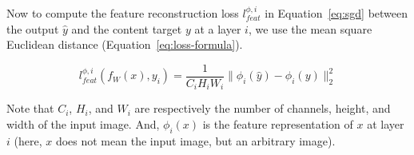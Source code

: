 \documentclass{article}
\begin{document}
{    Now to compute the feature reconstruction loss $l^{\phi, i}_{feat}$ in Equation~\ref{eq:sgd} between the output $\hat y$ and the content target $y$ at a layer $i$, we use the mean square Euclidean distance (Equation~\ref{eq:loss-formula}).

    \begin{equation}
        l^{\phi, i}_{feat}(f_W(x), y_i) = \frac{1}{C_i H_i W_i} \lVert \phi_i (\hat y) - \phi_i (y) \rVert_2^2
        \label{eq:loss-formula}
    \end{equation}

    Note that $C_i$, $H_i$, and $W_i$ are respectively the number of channels, height, and width of the input image. And, $\phi_i (x)$ is the feature representation of $x$ at layer $i$ (here, $x$ does not mean the input image, but an arbitrary image).
}
\end{document}
